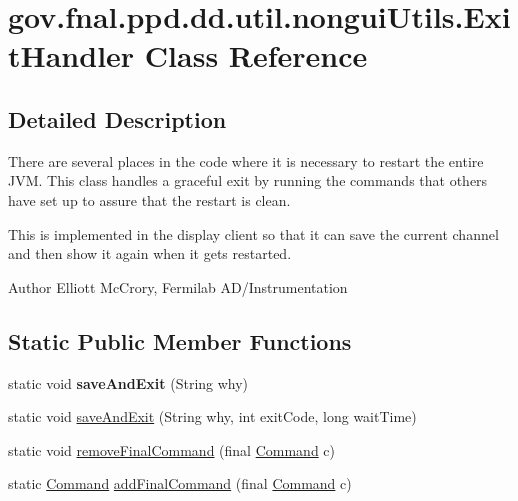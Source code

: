 \hypertarget{classgov_1_1fnal_1_1ppd_1_1dd_1_1util_1_1nonguiUtils_1_1ExitHandler}{\section{gov.\-fnal.\-ppd.\-dd.\-util.\-nongui\-Utils.\-Exit\-Handler Class Reference}
\label{classgov_1_1fnal_1_1ppd_1_1dd_1_1util_1_1nonguiUtils_1_1ExitHandler}
}


\subsection{Detailed Description}
There are several places in the code where it is necessary to restart the entire J\-V\-M. This class handles a graceful exit by running the commands that others have set up to assure that the restart is clean.

This is implemented in the display client so that it can save the current channel and then show it again when it gets restarted.

\begin{DoxyAuthor}{Author}
Elliott Mc\-Crory, Fermilab A\-D/\-Instrumentation 
\end{DoxyAuthor}
\subsection*{Static Public Member Functions}
\begin{DoxyCompactItemize}
\item 
\hypertarget{classgov_1_1fnal_1_1ppd_1_1dd_1_1util_1_1nonguiUtils_1_1ExitHandler_a27e7e4bcb97555bf97af048202206e23}{static void {\bfseries save\-And\-Exit} (String why)}\label{classgov_1_1fnal_1_1ppd_1_1dd_1_1util_1_1nonguiUtils_1_1ExitHandler_a27e7e4bcb97555bf97af048202206e23}

\item 
static void \hyperlink{classgov_1_1fnal_1_1ppd_1_1dd_1_1util_1_1nonguiUtils_1_1ExitHandler_a5379acd2ff353d389bceb772a08f38d3}{save\-And\-Exit} (String why, int exit\-Code, long wait\-Time)
\item 
static void \hyperlink{classgov_1_1fnal_1_1ppd_1_1dd_1_1util_1_1nonguiUtils_1_1ExitHandler_a7869ffc2150941cbeced332cdf57df3a}{remove\-Final\-Command} (final \hyperlink{interfacegov_1_1fnal_1_1ppd_1_1dd_1_1util_1_1nonguiUtils_1_1Command}{Command} c)
\item 
static \hyperlink{interfacegov_1_1fnal_1_1ppd_1_1dd_1_1util_1_1nonguiUtils_1_1Command}{Command} \hyperlink{classgov_1_1fnal_1_1ppd_1_1dd_1_1util_1_1nonguiUtils_1_1ExitHandler_acc32a4382054c480091b42cbf3055594}{add\-Final\-Command} (final \hyperlink{interfacegov_1_1fnal_1_1ppd_1_1dd_1_1util_1_1nonguiUtils_1_1Command}{Command} c)
\end{DoxyCompactItemize}
